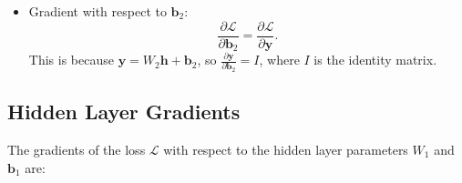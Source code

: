 \begin{notechapter}
\begin{itemize}
\begin{itemize}
        \( \frac{\partial \mathcal{L}}{\partial W_2} \), we get:
        \[
        \frac{\partial \mathcal{L}}{\partial W_2} = 
        \frac{\partial \mathcal{L}}{\partial y_1} \cdot 
        \begin{bmatrix}
        h_1 & h_2 & h_3 \\
        0 & 0 & 0
        \end{bmatrix} + 
        \frac{\partial \mathcal{L}}{\partial y_2} \cdot 
        \begin{bmatrix}
        0 & 0 & 0 \\
        h_1 & h_2 & h_3
        \end{bmatrix}.
        \]
        \item This results in:
        \[
        \frac{\partial \mathcal{L}}{\partial W_2} = 
        \begin{bmatrix}
        \frac{\partial \mathcal{L}}{\partial y_1} h_1 & 
        \frac{\partial \mathcal{L}}{\partial y_1} h_2 & 
        \frac{\partial \mathcal{L}}{\partial y_1} h_3 \\
        \frac{\partial \mathcal{L}}{\partial y_2} h_1 & 
        \frac{\partial \mathcal{L}}{\partial y_2} h_2 & 
        \frac{\partial \mathcal{L}}{\partial y_2} h_3
        \end{bmatrix}.
        \]
        \item This can be written compactly as:
        \[
        \frac{\partial \mathcal{L}}{\partial W_2} = 
        \left( \frac{\partial \mathcal{L}}{\partial \mathbf{y}} \right)^T 
        \cdot \mathbf{h}^T.
        \]
    \end{itemize}

    \item Gradient with respect to \( \mathbf{b}_2 \):
    \[
    \frac{\partial \mathcal{L}}{\partial \mathbf{b}_2} = 
    \frac{\partial \mathcal{L}}{\partial \mathbf{y}}.
    \]
    This is because \( \mathbf{y} = W_2 \mathbf{h} + \mathbf{b}_2 \), 
    so \( \frac{\partial \mathbf{y}}{\partial \mathbf{b}_2} = I \), 
    where \( I \) is the identity matrix.
\end{itemize}

\subsection{Hidden Layer Gradients}

The gradients of the loss \( \mathcal{L} \) with respect to the 
hidden layer parameters \( W_1 \) and \( \mathbf{b}_1 \) are:


\end{notechapter}
